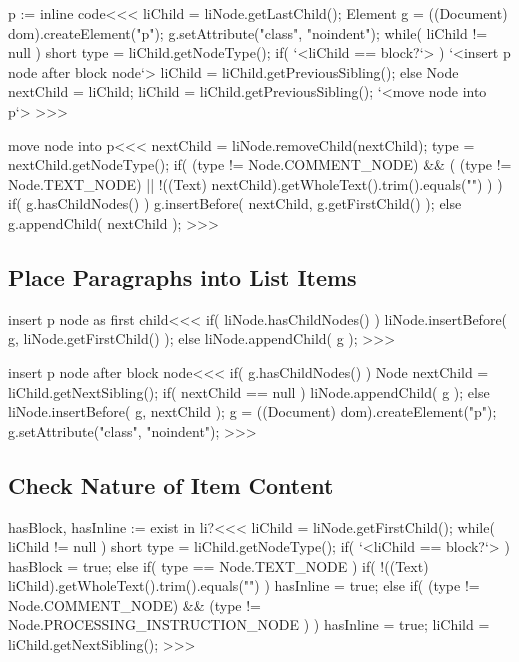\documentclass{article}
\begin{document}
\<p := inline code\><<<
liChild = liNode.getLastChild();
Element g = ((Document) dom).createElement("p");
g.setAttribute("class", "noindent");
while( liChild != null ){
   short type = liChild.getNodeType();
   if( `<liChild == block?`> ){
      `<insert p node after block node`>
      liChild = liChild.getPreviousSibling();
   } else {            
      Node nextChild = liChild;
      liChild = liChild.getPreviousSibling();
      `<move node into p`>
}  }
>>>


\<move node into p\><<<
nextChild = liNode.removeChild(nextChild);
type = nextChild.getNodeType();
if(
     (type != Node.COMMENT_NODE)
   &&
   (
     (type != Node.TEXT_NODE)
   ||
     !((Text) nextChild).getWholeText().trim().equals("") 
   )
){
   if( g.hasChildNodes() ){
      g.insertBefore( nextChild, g.getFirstChild() );
   } else {
      g.appendChild( nextChild );
} } 
>>>         

\subsection{Place Paragraphs into List Items}

\<insert p node as first child\><<<
if( liNode.hasChildNodes() ){
  liNode.insertBefore( g, liNode.getFirstChild() );
} else {
  liNode.appendChild( g );
}
>>>


\<insert p node after block node\><<<
if( g.hasChildNodes() ){
   Node nextChild = liChild.getNextSibling();
   if( nextChild == null  ){
      liNode.appendChild( g );
   } else {
      liNode.insertBefore( g, nextChild );
   }
   g = ((Document) dom).createElement("p");
   g.setAttribute("class", "noindent");
}
>>>



\subsection{Check Nature of Item Content}

\<hasBlock, hasInline := exist in li?\><<<
liChild = liNode.getFirstChild();
while( liChild != null ){
   short type = liChild.getNodeType();
   if( `<liChild == block?`> ){  hasBlock = true; }
   else if(  type == Node.TEXT_NODE ){ 
      if( !((Text) liChild).getWholeText().trim().equals("") ){
         hasInline = true;
   }  }
   else if( 
       (type != Node.COMMENT_NODE)
       &&
       (type != Node.PROCESSING_INSTRUCTION_NODE )
   ){ 
      hasInline = true;
   }
   liChild = liChild.getNextSibling();
}
>>>
\end{document}
